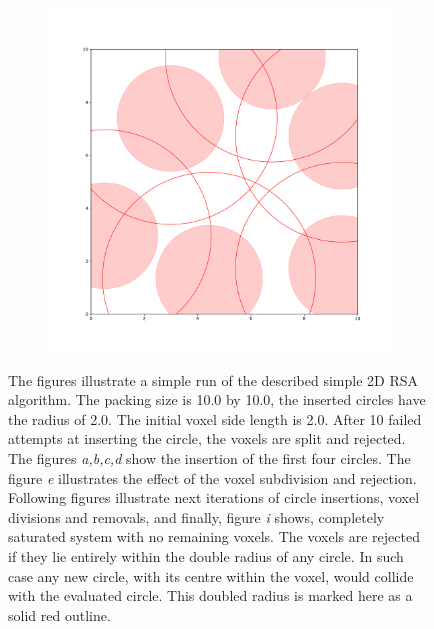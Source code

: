 \documentclass[12pt, oneside]{report}
\begin{document}
\begin{figure}[H]
\begin{subfigure}[b]{0.3\linewidth}
    \caption{}
  \end{subfigure}
  \begin{subfigure}[b]{0.3\linewidth}
    \includegraphics[width=\linewidth]{Images/2dCircleRSA/fig9.pdf}
    \caption{}
  \end{subfigure}

  \caption{The figures illustrate a simple run of the described simple 2D RSA algorithm. \newline
		The packing size is 10.0 by 10.0, the inserted circles have the radius of 2.0. The initial voxel side length is 2.0. After 10 failed attempts at inserting the circle, the voxels are split and rejected.\newline
		The figures \textit{a,b,c,d} show the insertion of the first four circles. The figure \textit{e} illustrates the effect of the voxel subdivision and rejection. Following figures illustrate next iterations of circle insertions, voxel divisions and removals, and finally, figure \textit{i} shows, completely saturated system with no remaining voxels. \newline
		The voxels are rejected if they lie entirely within the double radius of any circle. In such case any new circle, with its centre within the voxel, would collide with the evaluated circle. This doubled radius is marked here as a solid red outline.}
  \label{VoxelCircleRSApdfExamples}
\end{figure}
\end{document}

